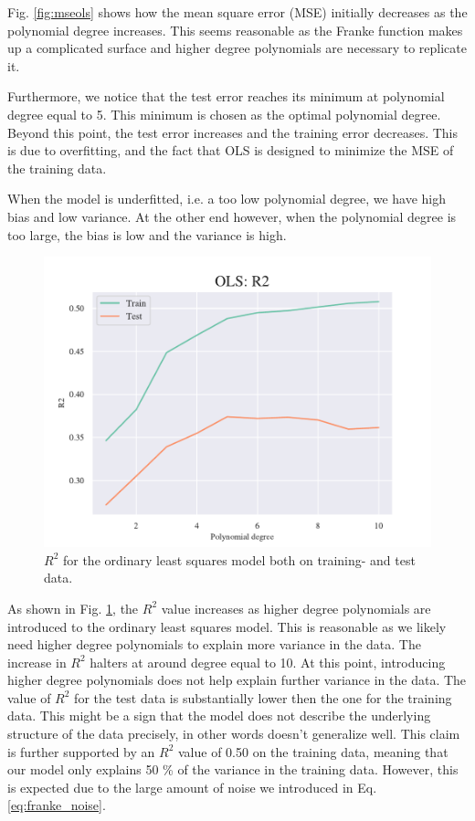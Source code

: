 Fig. \ref{fig:mseols} shows how the mean square error (MSE) initially decreases as the polynomial degree increases. This seems reasonable as the Franke function makes up a complicated surface and higher degree polynomials are necessary to replicate it. 

Furthermore, we notice that the test error reaches its minimum at polynomial degree equal to 5. 
This minimum is chosen as the optimal polynomial degree. 
Beyond this point, the test error increases and the training error decreases.
This is due to overfitting, and the fact that OLS is designed to minimize the MSE of the training data. 

When the model is underfitted, i.e. a too low polynomial degree, we have high bias and low variance. At the other end however, when the polynomial degree is too large, the bias is low and the variance is high. 

\begin{figure}[h!]
    \centering
    \includegraphics[width=1\linewidth]{project_1/figures/figures_in_report/OLS_R2_Franke_Noise.pdf}
    \caption{$R^2$ for the ordinary least squares model both on training- and test data.}
    \label{fig:r2ols}
\end{figure}

As shown in Fig. \ref{fig:r2ols}, the $R^2$ value increases as higher degree polynomials are introduced to the ordinary least squares model. 
This is reasonable as we likely need higher degree polynomials to explain more variance in the data. The increase in $R^2$ halters at around degree equal to 10. 
At this point, introducing higher degree polynomials does not help explain further variance in the data. 
The value of $R^2$ for the test data is substantially lower then the one for the training data. 
This might be a sign that the model does not describe the underlying structure of the data precisely, in other words doesn't generalize well. 
This claim is further supported by an $R^2$ value of 0.50 on the training data, meaning that our model only explains 50 \% of the variance in the training data.
However, this is expected due to the large amount of noise we introduced in Eq. \ref{eq:franke_noise}.

